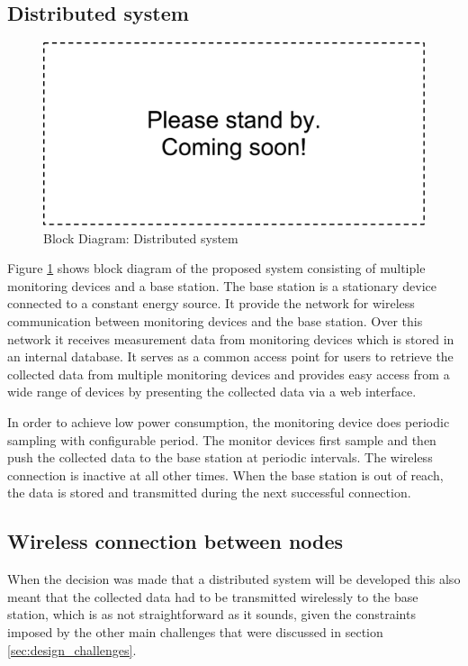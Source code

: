 \subsection{Distributed system}
\begin{figure}
\includegraphics[width=\textwidth]{Images/dummy}
\caption{Block Diagram: Distributed system}
\label{fig:block_system}
\end{figure}

Figure \ref{fig:block_system} shows  block diagram of the proposed system consisting of multiple monitoring devices and a base station. 
The base station is a stationary device connected to a constant energy source. It provide the network for wireless communication between monitoring devices and the base station. Over this network it receives measurement data from monitoring devices which is stored in an internal database. It serves as a common access point for users to retrieve the collected data from multiple monitoring devices and provides easy access from a wide range of devices by presenting the collected data via a web interface.

In order to achieve low power consumption, the monitoring device does periodic sampling with configurable period. The monitor devices first sample and then push the collected data to the base station at periodic intervals. The wireless connection is inactive at all other times. When the base station is out of reach, the data is stored and transmitted during the next successful connection.


\subsection{Wireless connection between nodes}
\label{sec:wireless_connection}
When the decision was made that a distributed system will be developed this also meant that the collected data had to be transmitted wirelessly to the base station, which is as not straightforward as it sounds, given the constraints imposed by the other main challenges that were discussed in section \ref{sec:design_challenges}.

